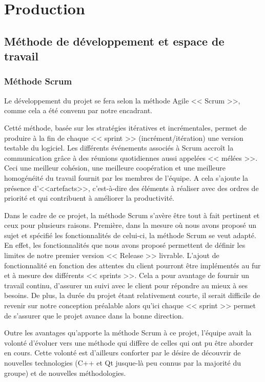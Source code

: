 \chapter{Production}
\section{Méthode de développement et espace de travail}
\subsection{Méthode Scrum}
Le développement du projet se fera selon la méthode Agile << Scrum >>, comme cela a été convenu par notre encadrant.

Cetté méthode, basée sur les stratégies itératives et incrémentales, permet de produire à la fin de chaque << sprint >> (incrément/itération) une version testable du logiciel. Les différents événements associés à Scrum accroît la communication grâce à des réunions quotidiennes aussi appelées << mélées >>. Ceci une meilleur cohésion, une meilleure coopération et une meilleure homogénéité du travail fournit par les membres de l'équipe. A cela s'ajoute la présence d'<<artefacts>>, c'est-à-dire des éléments à réaliser avec des ordres de priorité et qui contribuent à améliorer la productivité. 
                    
Dans le cadre de ce projet, la méthode Scrum s’avère être tout à fait pertinent et ceux pour plusieurs raisons.  Première, dans la mesure où nous avons proposé un sujet et spécifié les fonctionnalités de celui-ci, la méthode Scrum se veut adapté. En effet, les fonctionnalités que nous avons proposé permettent de définir les limites de notre premier version << Release >> livrable. L’ajout de fonctionnalité en fonction des attentes du client pourront être implémentés au fur et à mesure des différents << sprints >>.  Cela a pour avantage de fournir un travail continu, d’assurer un suivi avec le client pour répondre au mieux à ses besoins. De plus, la durée du projet étant relativement courte, il serait difficile de revenir sur notre conception préalable alors qu’ici chaque << sprint >> permet de s’assurer que le projet avance dans la bonne direction.  

Outre les avantages qu’apporte la méthode Scrum à ce projet, l’équipe avait la volonté d’évoluer vers une méthode qui diffère de celles qui ont pu être aborder en cours. Cette volonté est d’ailleurs conforter par le désire de découvrir  de nouvelles technologies (C++ et Qt jusque-là peu connus par la majorité du groupe) et de nouvelles méthodologies. 

